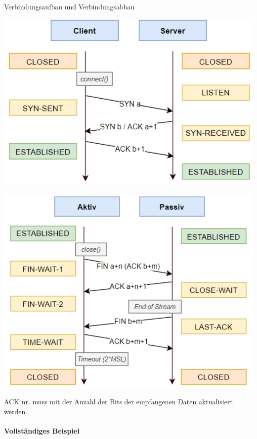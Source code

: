 \begin{KR}{Verbindungsaufbau und Verbindungsabbau}\\
\begin{minipage}{0.49\linewidth}
        \includegraphics[width=1\linewidth]{images/verbindungsaufbau.png}
\end{minipage}
\begin{minipage}{0.5\linewidth}
        \includegraphics[width=1\linewidth]{images/Verbindungsabbau.png}
\end{minipage}

ACK nr. muss mit der Anzahl der Bits der empfangenen Daten aktualisiert werden.
\end{KR}

\paragraph*{Vollständiges Beispiel}


